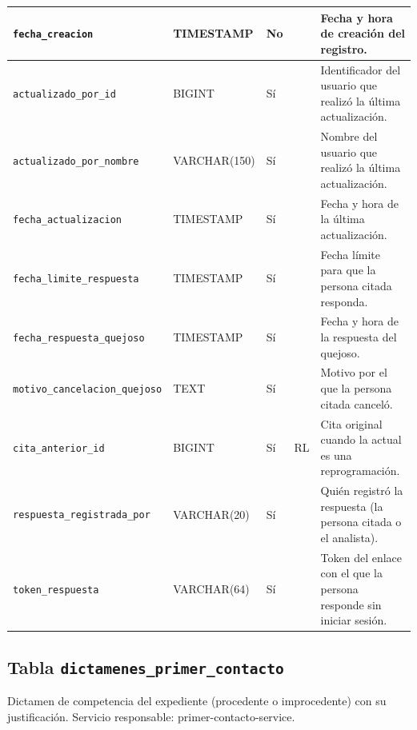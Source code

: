 \begin{longtable}{|L{3.9cm}|L{2.4cm}|L{0.9cm}|L{1.2cm}|L{6.6cm}|}
		\texttt{fecha\_\allowbreak{}creacion} & TIMESTAMP & No &  & Fecha y hora de creación del registro. \\ \hline
		\texttt{actualizado\_\allowbreak{}por\_\allowbreak{}id} & BIGINT & Sí &  & Identificador del usuario que realizó la última actualización. \\ \hline
		\texttt{actualizado\_\allowbreak{}por\_\allowbreak{}nombre} & VARCHAR(150) & Sí &  & Nombre del usuario que realizó la última actualización. \\ \hline
		\texttt{fecha\_\allowbreak{}actualizacion} & TIMESTAMP & Sí &  & Fecha y hora de la última actualización. \\ \hline
		\texttt{fecha\_\allowbreak{}limite\_\allowbreak{}respuesta} & TIMESTAMP & Sí &  & Fecha límite para que la persona citada responda. \\ \hline
		\texttt{fecha\_\allowbreak{}respuesta\_\allowbreak{}quejoso} & TIMESTAMP & Sí &  & Fecha y hora de la respuesta del quejoso. \\ \hline
		\texttt{motivo\_\allowbreak{}cancelacion\_\allowbreak{}quejoso} & TEXT & Sí &  & Motivo por el que la persona citada canceló. \\ \hline
		\texttt{cita\_\allowbreak{}anterior\_\allowbreak{}id} & BIGINT & Sí & RL & Cita original cuando la actual es una reprogramación. \\ \hline
		\texttt{respuesta\_\allowbreak{}registrada\_\allowbreak{}por} & VARCHAR(20) & Sí &  & Quién registró la respuesta (la persona citada o el analista). \\ \hline
		\texttt{token\_\allowbreak{}respuesta} & VARCHAR(64) & Sí &  & Token del enlace con el que la persona responde sin iniciar sesión. \\ \hline
\end{longtable}
\normalsize
\setlength{\tabcolsep}{6pt}
\renewcommand{\arraystretch}{1}

\subsection{Tabla \texttt{dictamenes\_primer\_contacto}}
Dictamen de competencia del expediente (procedente o improcedente) con su justificación. Servicio responsable: primer-contacto-service.


